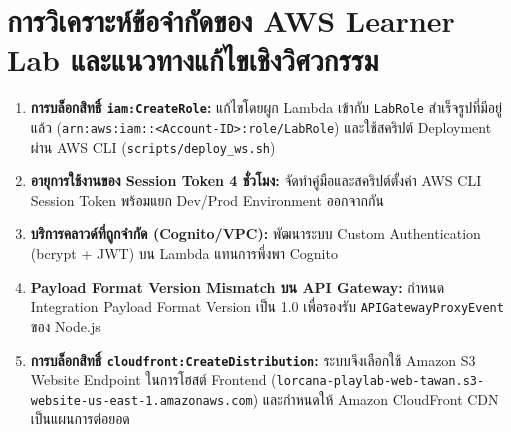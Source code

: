 \documentclass[12pt,a4paper]{report}
\begin{document}
\section{การวิเคราะห์ข้อจำกัดของ AWS Learner Lab และแนวทางแก้ไขเชิงวิศวกรรม}
\begin{enumerate}
    \item \textbf{การบล็อกสิทธิ์ \texttt{iam:CreateRole}:} แก้ไขโดยผูก Lambda เข้ากับ \texttt{LabRole} สำเร็จรูปที่มีอยู่แล้ว (\texttt{arn:aws:iam::<Account-ID>:role/LabRole}) และใช้สคริปต์ Deployment ผ่าน AWS CLI (\texttt{scripts/deploy\_ws.sh})
    \item \textbf{อายุการใช้งานของ Session Token 4 ชั่วโมง:} จัดทำคู่มือและสคริปต์ตั้งค่า AWS CLI Session Token พร้อมแยก Dev/Prod Environment ออกจากกัน
    \item \textbf{บริการคลาวด์ที่ถูกจำกัด (Cognito/VPC):} พัฒนาระบบ Custom Authentication (bcrypt + JWT) บน Lambda แทนการพึ่งพา Cognito
    \item \textbf{Payload Format Version Mismatch บน API Gateway:} กำหนด Integration Payload Format Version เป็น 1.0 เพื่อรองรับ \texttt{APIGatewayProxyEvent} ของ Node.js
\item \textbf{การบล็อกสิทธิ์ \texttt{cloudfront:CreateDistribution}:} ระบบจึงเลือกใช้ Amazon S3 Website Endpoint ในการโฮสต์ Frontend (\texttt{lorcana-playlab-web-tawan.s3-website-us-east-1.amazonaws.com}) และกำหนดให้ Amazon CloudFront CDN เป็นแผนการต่อยอด
\end{enumerate}
\end{document}
